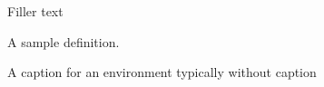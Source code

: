 \documentclass{memoir}
\begin{document}
Filler text

\begin{defn}[Definition 2]
\label{defn:definition_2}
A sample definition.

\caption{A caption for an environment typically without caption}
\end{defn}

\end{document}
